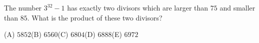 The number $3^{32}-1$ has exactly two divisors which are larger than $75$ and smaller than $85$. What is the product of these two divisors?

(A) $5852$\quad (B) $6560$\quad (C) $6804$\quad (D) $6888$\quad (E) $6972$
